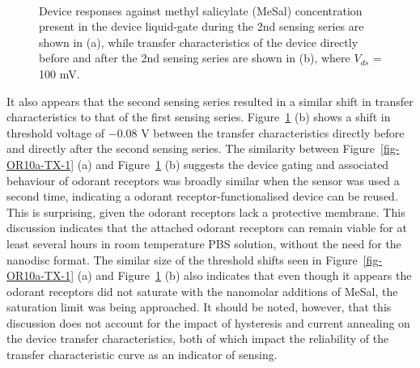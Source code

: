 \documentclass[
  a4paper,
]{scrbook}
\begin{document}
\begin{figure}
\begin{minipage}[t]{0.45\linewidth}
{{}

}

\end{minipage}%
%
\begin{minipage}[t]{0.01\linewidth}

{\centering 

~

}

\end{minipage}%

\caption[Device responses against methyl salicylate concentration
present in the device liquid-gate during the 2nd sensing series,
alongside transfer characteristics of the device directly before and
after the 2nd sensing series.]{\label{fig-OR10a-signal-TX}Device
responses against methyl salicylate (MeSal) concentration present in the
device liquid-gate during the 2nd sensing series are shown in (a), while
transfer characteristics of the device directly before and after the 2nd
sensing series are shown in (b), where \(V_{ds}\) = 100 mV.}

\end{figure}

It also appears that the second sensing series resulted in a similar
shift in transfer characteristics to that of the first sensing series.
Figure~\ref{fig-OR10a-signal-TX} (b) shows a shift in threshold voltage
of \(-0.08\) V between the transfer characteristics directly before and
directly after the second sensing series. The similarity between
Figure~\ref{fig-OR10a-TX-1} (a) and Figure~\ref{fig-OR10a-signal-TX} (b)
suggests the device gating and associated behaviour of odorant receptors
was broadly similar when the sensor was used a second time, indicating a
odorant receptor-functionalised device can be reused. This is
surprising, given the odorant receptors lack a protective membrane. This
discussion indicates that the attached odorant receptors can remain
viable for at least several hours in room temperature PBS solution,
without the need for the nanodisc format. The similar size of the
threshold shifts seen in Figure~\ref{fig-OR10a-TX-1} (a) and
Figure~\ref{fig-OR10a-signal-TX} (b) also indicates that even though it
appears the odorant receptors did not saturate with the nanomolar
additions of MeSal, the saturation limit was being approached. It should
be noted, however, that this discussion does not account for the impact
of hysteresis and current annealing on the device transfer
characteristics, both of which impact the reliability of the transfer
characteristic curve as an indicator of sensing.
\end{document}
